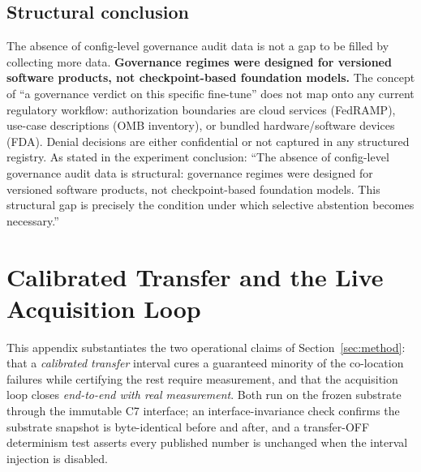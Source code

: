 \documentclass{article} %
\begin{document}
\subsection*{Structural conclusion}
The absence of config-level governance audit data is not a gap to be filled by collecting more data.
\textbf{Governance regimes were designed for versioned software products, not checkpoint-based foundation models.}
The concept of ``a governance verdict on this specific fine-tune'' does not map onto any current regulatory workflow: authorization boundaries are cloud services (FedRAMP), use-case descriptions (OMB inventory), or bundled hardware/software devices (FDA).
Denial decisions are either confidential or not captured in any structured registry.
As stated in the experiment conclusion: ``The absence of config-level governance audit data is structural: governance regimes were designed for versioned software products, not checkpoint-based foundation models.
This structural gap is precisely the condition under which selective abstention becomes necessary.''

\section{Calibrated Transfer and the Live Acquisition Loop}
\label{app:transfer}

This appendix substantiates the two operational claims of Section~\ref{sec:method}: that a \emph{calibrated transfer} interval cures a guaranteed minority of the co-location failures while certifying the rest require measurement, and that the acquisition loop closes \emph{end-to-end with real measurement}. Both run on the frozen substrate through the immutable C7 interface; an interface-invariance check confirms the substrate snapshot is byte-identical before and after, and a transfer-OFF determinism test asserts every published number is unchanged when the interval injection is disabled.
\end{document}
